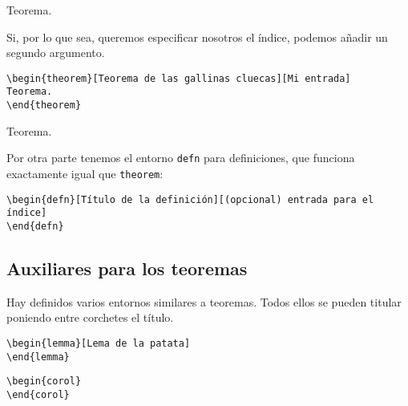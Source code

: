 \documentclass{apuntes}
\begin{document}
\begin{theorem}
Teorema.
\end{theorem}

Si, por lo que sea, queremos especificar nosotros el índice, podemos añadir un segundo argumento.

\begin{verbatim}
\begin{theorem}[Teorema de las gallinas cluecas][Mi entrada]
Teorema.
\end{theorem}
\end{verbatim}

\begin{theorem}
Teorema.
\end{theorem}

Por otra parte tenemos el entorno \texttt{defn} para definiciones, que funciona exactamente igual que \texttt{theorem}:

\begin{verbatim}
\begin{defn}[Título de la definición][(opcional) entrada para el índice]
\end{defn}
\end{verbatim}

\begin{defn}
\end{defn}

\subsection{Auxiliares para los teoremas}

Hay definidos varios entornos similares a teoremas. Todos ellos se pueden titular poniendo entre corchetes el título.

\begin{verbatim}
\begin{lemma}[Lema de la patata]
\end{lemma}
\end{verbatim}

\begin{lemma}
\end{lemma}

\begin{verbatim}
\begin{corol}
\end{corol}
\end{verbatim}
\end{document}
